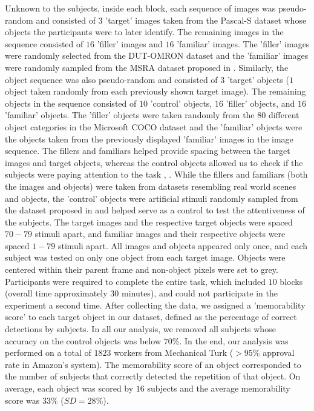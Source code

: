 Unknown to the subjects, inside each block, each sequence of images was pseudo-random and consisted of $3$ 'target' images taken from the Pascal-S dataset whose objects the participants were to later identify. The remaining images in the sequence consisted of $16$ 'filler' images and $16$ 'familiar' images. The 'filler' images were randomly selected from the DUT-OMRON dataset \cite{dutomron13} and the 'familiar' images were randomly sampled from the MSRA dataset proposed in \cite{msra11}. Similarly, the object sequence was also pseudo-random and consisted of $3$ 'target' objects ($1$ object taken randomly from each previously shown target image). The remaining objects in the sequence consisted of $10$ 'control' objects, $16$ 'filler' objects, and $16$ 'familiar' objects. The 'filler' objects were taken randomly from the $80$ different object categories in the Microsoft COCO dataset \cite{coco14} and the 'familiar' objects were the objects taken from the previously displayed 'familiar' images in the image sequence. The fillers and familiars helped provide spacing between the target images and target objects, whereas the control objects allowed us to check if the subjects were paying attention to the task \cite{brady08}, \cite{isola11}. While the fillers and familiars (both the images and objects) were taken from datasets resembling real world scenes and objects, the 'control' objects were artificial stimuli randomly sampled from the dataset proposed in \cite{brady08} and helped serve as a control to test the attentiveness of the subjects. The target images and the respective target objects were spaced $70-79$ stimuli apart, and familiar images and their respective objects were spaced $1-79$ stimuli apart. All images and objects appeared only once, and each subject was tested on only one object from each target image. Objects were centered within their parent frame and non-object pixels were set to grey. Participants were required to complete the entire task, which included $10$ blocks (overall time approximately $30$ minutes), and could not participate in the experiment a second time. After collecting the data, we assigned a 'memorability score' to each target object in our dataset, defined as the percentage of correct detections by subjects. In all our analysis, we removed all subjects whose accuracy on the control objects was below $70\%$. In the end, our analysis was performed on a total of {$1823$} workers from Mechanical Turk ($> 95\%$ approval rate in Amazon’s system).  The memorability score of an object corresponded to the number of subjects that correctly detected the repetition of that object. On average, each object was scored by $16$ subjects and the average memorability score was $33\%$ ($SD = 28\%$). 